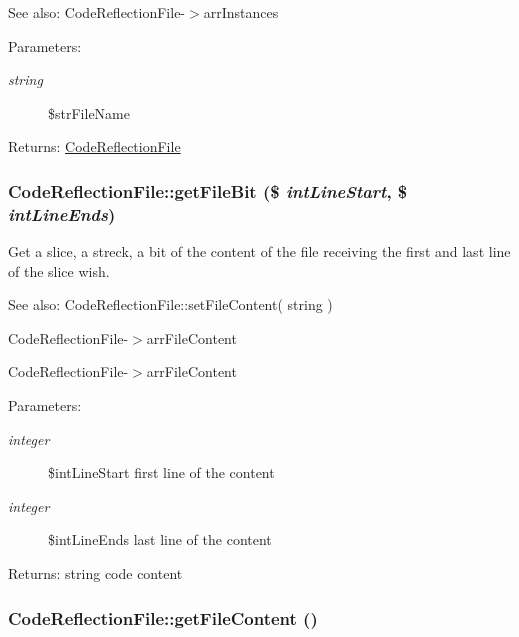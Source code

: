\begin{Desc}
\item[See also:]CodeReflectionFile-$>$arrInstances \end{Desc}
\begin{Desc}
\item[Parameters:]
\begin{description}
\item[{\em string}]\$strFileName \end{description}
\end{Desc}
\begin{Desc}
\item[Returns:]\hyperlink{class_code_reflection_file}{CodeReflectionFile} \end{Desc}
\hypertarget{class_code_reflection_file_d5d0f670cbe1798cb50ad67ae37a9164}{
\subsubsection[{getFileBit}]{\setlength{\rightskip}{0pt plus 5cm}CodeReflectionFile::getFileBit (\$ {\em intLineStart}, \/  \$ {\em intLineEnds})}}
\label{class_code_reflection_file_d5d0f670cbe1798cb50ad67ae37a9164}


Get a slice, a streck, a bit of the content of the file receiving the first and last line of the slice wish.

\begin{Desc}
\item[See also:]CodeReflectionFile::setFileContent( string ) 

CodeReflectionFile-$>$arrFileContent 

CodeReflectionFile-$>$arrFileContent \end{Desc}
\begin{Desc}
\item[Parameters:]
\begin{description}
\item[{\em integer}]\$intLineStart first line of the content \item[{\em integer}]\$intLineEnds last line of the content \end{description}
\end{Desc}
\begin{Desc}
\item[Returns:]string code content \end{Desc}
\hypertarget{class_code_reflection_file_f87150d5f818f1b92d30db63dfdf966a}{
\subsubsection[{getFileContent}]{\setlength{\rightskip}{0pt plus 5cm}CodeReflectionFile::getFileContent ()}}
\label{class_code_reflection_file_f87150d5f818f1b92d30db63dfdf966a}


